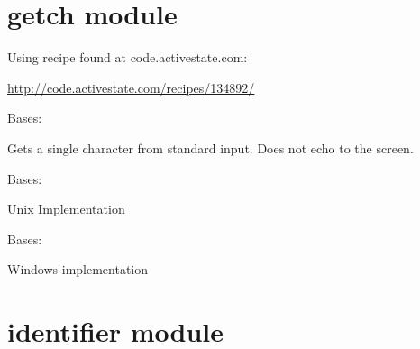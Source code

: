 \documentclass[letterpaper,10pt,english]{sphinxmanual}
\begin{document}
\chapter{getch module}
\label{\detokenize{getch:getch-module}}\label{\detokenize{getch::doc}}\label{\detokenize{getch:module-getch}}
Using recipe found at code.activestate.com:

\url{http://code.activestate.com/recipes/134892/}

\begin{fulllineitems}
\label{\detokenize{getch:getch.Getch}}
Bases: 

Gets a single character from standard input.  Does not echo to the screen.

\end{fulllineitems}


\begin{fulllineitems}
\label{\detokenize{getch:getch.GetchUnix}}
Bases: 

Unix Implementation

\end{fulllineitems}


\begin{fulllineitems}
\label{\detokenize{getch:getch.GetchWindows}}
Bases: 

Windows implementation

\end{fulllineitems}



\chapter{identifier module}
\label{\detokenize{identifier:module-identifier}}\label{\detokenize{identifier::doc}}\label{\detokenize{identifier:identifier-module}}
\end{document}
